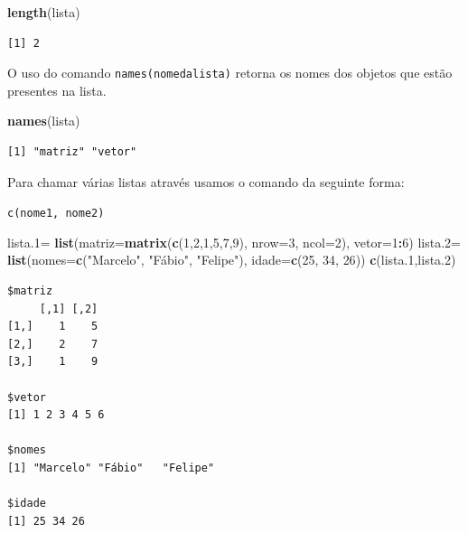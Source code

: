 \documentclass[12pt,brazil,]{book}
\newenvironment{Shaded}{\begin{snugshade}}{\end{snugshade}}
\newcommand{\DataTypeTok}[1]{\textcolor[rgb]{0.13,0.29,0.53}{#1}}
\newcommand{\DecValTok}[1]{\textcolor[rgb]{0.00,0.00,0.81}{#1}}
\newcommand{\FloatTok}[1]{\textcolor[rgb]{0.00,0.00,0.81}{#1}}
\newcommand{\KeywordTok}[1]{\textcolor[rgb]{0.13,0.29,0.53}{\textbf{#1}}}
\newcommand{\NormalTok}[1]{#1}
\newcommand{\OperatorTok}[1]{\textcolor[rgb]{0.81,0.36,0.00}{\textbf{#1}}}
\newcommand{\StringTok}[1]{\textcolor[rgb]{0.31,0.60,0.02}{#1}}
\begin{document}
\begin{Shaded}
\begin{Highlighting}[]
\KeywordTok{length}\NormalTok{(lista)}
\end{Highlighting}
\end{Shaded}

\begin{verbatim}
[1] 2
\end{verbatim}

O uso do comando \texttt{names(nomedalista)} retorna os nomes dos
objetos que estão presentes na lista.

\begin{Shaded}
\begin{Highlighting}[]
\KeywordTok{names}\NormalTok{(lista)}
\end{Highlighting}
\end{Shaded}

\begin{verbatim}
[1] "matriz" "vetor" 
\end{verbatim}

Para chamar várias listas através usamos o comando da seguinte forma:

\texttt{c(nome1,\ nome2)}

\begin{Shaded}
\begin{Highlighting}[]
\NormalTok{lista}\FloatTok{.1}\NormalTok{=}\StringTok{ }\KeywordTok{list}\NormalTok{(}\DataTypeTok{matriz=}\KeywordTok{matrix}\NormalTok{(}\KeywordTok{c}\NormalTok{(}\DecValTok{1}\NormalTok{,}\DecValTok{2}\NormalTok{,}\DecValTok{1}\NormalTok{,}\DecValTok{5}\NormalTok{,}\DecValTok{7}\NormalTok{,}\DecValTok{9}\NormalTok{), }\DataTypeTok{nrow=}\DecValTok{3}\NormalTok{, }\DataTypeTok{ncol=}\DecValTok{2}\NormalTok{),}
              \DataTypeTok{vetor=}\DecValTok{1}\OperatorTok{:}\DecValTok{6}\NormalTok{)}
\NormalTok{lista}\FloatTok{.2}\NormalTok{=}\StringTok{ }\KeywordTok{list}\NormalTok{(}\DataTypeTok{nomes=}\KeywordTok{c}\NormalTok{(}\StringTok{"Marcelo"}\NormalTok{, }\StringTok{"Fábio"}\NormalTok{, }\StringTok{"Felipe"}\NormalTok{), }
              \DataTypeTok{idade=}\KeywordTok{c}\NormalTok{(}\DecValTok{25}\NormalTok{, }\DecValTok{34}\NormalTok{, }\DecValTok{26}\NormalTok{))}
\KeywordTok{c}\NormalTok{(lista}\FloatTok{.1}\NormalTok{,lista}\FloatTok{.2}\NormalTok{)}
\end{Highlighting}
\end{Shaded}

\begin{verbatim}
$matriz
     [,1] [,2]
[1,]    1    5
[2,]    2    7
[3,]    1    9

$vetor
[1] 1 2 3 4 5 6

$nomes
[1] "Marcelo" "Fábio"   "Felipe" 

$idade
[1] 25 34 26
\end{verbatim}
\end{document}

